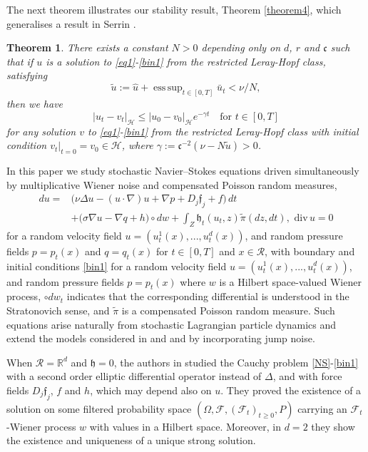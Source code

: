 \documentclass[11pt,reqno]{amsart}
\DeclareMathOperator*{\esssup}{ess\,sup}
\newtheorem{theorem}{Theorem}[section]
\theoremstyle{definition}
\theoremstyle{remark}
\newcommand\bR{\mathbb{R}}
\newcommand\frc{\mathfrak{c}}
\newcommand\frf{\mathfrak{f}}
\newcommand\frh{\mathfrak{h}}
\newcommand\cF{\mathcal{F}}
\newcommand\cH{\mathcal{H}}
\newcommand\cR{\mathcal{R}}
\newcommand{\<}{\langle}
\renewcommand{\>}{\rangle}
\begin{document}
The next theorem illustrates our stability result, Theorem \ref{theorem4},
which generalises a result in Serrin \cite{Serrin1963}. 

\begin{theorem}
                             \label{theorem stability}
 There exists a constant $N>0$ depending only on $d$, $r$ and $\frc$ 
 such that if $u$ is a solution to \eqref{eq1}-\eqref{bin1} from the restricted 
 Leray-Hopf class, satisfying 
\begin{equation*}
                                                 \label{stability}
 \tilde u:=\hat u+\esssup_{t\in[0,T]}\bar u_t<\nu/N, 
\end{equation*}
 then we have 
 $$
 |u_t-v_t|_{\cH}\leq |u_0-v_0|_{\cH}e^{-\gamma t}\quad\text{for $t\in[0,T]$}
 $$
 for any solution $v$ to \eqref{eq1}-\eqref{bin1} from the restricted Leray-Hopf 
 class with initial condition $v_t|_{t=0}=v_0\in\cH$, where 
 $\gamma:=\frc^{-2}(\nu-N\tilde u)>0$.  
 \end{theorem}
 
 
 In this paper we study 
 stochastic Navier–Stokes equations driven simultaneously 
 by multiplicative Wiener noise and compensated Poisson random measures, 
 \begin{align}
du=&\big(\nu\Delta u-(u\cdot\nabla) u
+\nabla p+D_j\frf_j +f \big)\,dt                                                                  \nonumber\\
&+\big(\sigma\nabla u-\nabla q+h\big)\circ dw
+\int_{Z}\frh_t(u_t,z)\tilde \pi(dz,dt), \,\,\text{div}\, u=0                                                       \label{NS}
\end{align}
for a random velocity field $u=(u_t^1(x),...,u^d_t(x))$,  
and random pressure fields $p=p_t(x)$ 
and $q=q_t(x)$ for $t\in[0,T]$ and $x\in\cR$, with boundary and initial conditions
\eqref{bin1}
for a random velocity field $u=(u_t^1(x),...,u^d_t(x))$,  
and random pressure fields $p=p_t(x)$ 
where $w$ is a Hilbert space-valued 
Wiener process, $\circ dw_t$ indicates that the corresponding differential 
is understood in the Stratonovich sense, and $\tilde\pi$ is a compensated 
Poisson random measure. 
Such equations arise naturally from stochastic Lagrangian particle dynamics 
and extend the models considered in  \cite{MR2001} and 
\cite{MR2004} and \cite{MR2005} by incorporating jump noise.

When $\cR=\bR^d$ and $\frh=0$, the authors in \cite{MR2005} 
studied the Cauchy problem \eqref{NS}-\eqref{bin1}
with a second order elliptic differential operator 
instead of $\Delta$,  and with force fields 
$D_j\frf_j$, $f$ and $h$, which may depend also on $u$. 
They proved the existence of a solution on some filtered probability 
space $(\Omega,\cF,(\cF_t)_{t\geq0},P)$ 
carrying an $\cF_t$-Wiener process $w$ with values in a Hilbert space. 
Moreover, in $d=2$ they show the existence 
and uniqueness of a unique strong solution.
\end{document}
